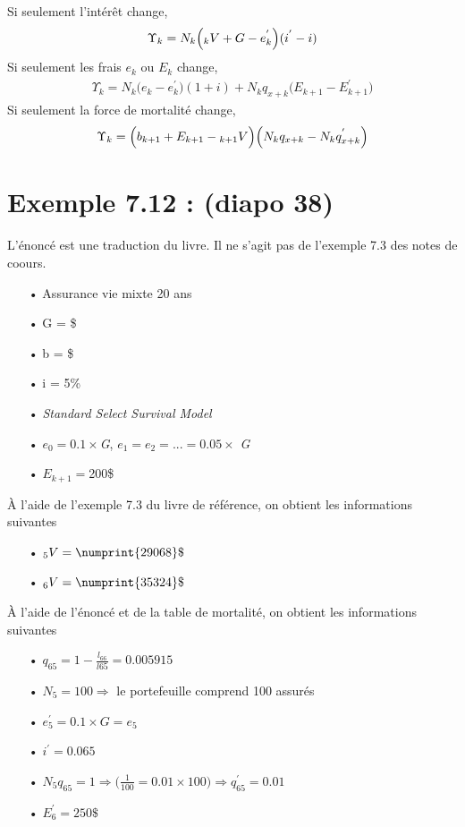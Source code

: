 \documentclass[11pt,french]{report}
\newcommand{\indiceGauche}[2]{{\vphantom{#2}}_{#1}#2}
\begin{document}
Si seulement l'intérêt change,
\begin{align*}
\Upsilon_k = N_k\Big( \indiceGauche{k}{V} + G - e_k^{'}\Big)(i^{'} - i)
\end{align*}
Si seulement les frais $e_k$ ou $E_k$ change,
\begin{align*}
\Upsilon_k = N_k\Big( e_k - e_k^{'}\Big)(1 + i) + N_k q_{x+k} \Big( E_{k+1} - E_{k+1}^{'}\Big)
\end{align*}
Si seulement la force de mortalité change,
\begin{align*}
\Upsilon_k = \Big(b_{k+1} + E_{k+1} - \indiceGauche{k+1}{V}\Big) \Big(N_kq_{x+k} - N_kq_{x+k}^{'}\Big)
\end{align*}

\section{Exemple 7.12 : (diapo 38)}
L'énoncé est une traduction du livre. Il ne s'agit pas de l'exemple 7.3 des notes de coours.
\begin{itemize}
\item[•] Assurance vie mixte 20 ans
\item[•] G = \$
\item[•] b = \$
\item[•] i = 5\%
\item[•] \emph{Standard Select Survival Model}
\item[•] $e_0 = 0.1 \times $\textit{G}, $e_1 = e_2 = ...= 0.05 \times$ \textit{G}
\item[•] $E_{k+1} = $200\$
\end{itemize}
À l'aide de l'exemple 7.3 du livre de référence, on obtient les informations suivantes
\begin{itemize}
\item[•] $\indiceGauche{5}{V} = \numprint{29068}\$$
\item[•] $\indiceGauche{6}{V} = \numprint{35324}\$$
\end{itemize}
À l'aide de l'énoncé et de la table de mortalité, on obtient les informations suivantes
\begin{itemize}
\item[•] $q_{65} = 1 - \frac{l_{66}}{l{65}} = 0.005915$
\item[•] $N_{5} = 100 \Rightarrow $ le portefeuille comprend 100 assurés
\item[•] $e_{5}^{'} = 0.1 \times \textit{G} = e_{5}$
\item[•] $i^{'} = 0.065$ 
\item[•] $N_{5}q_{65} = 1 \Rightarrow \Big( \frac{1}{100} = 0.01 \times 100\Big) \Rightarrow q_{65}^{'} = 0.01 $
\item[•] $E_{6}^{'} = 250\$ $
\end{itemize}
\end{document}
